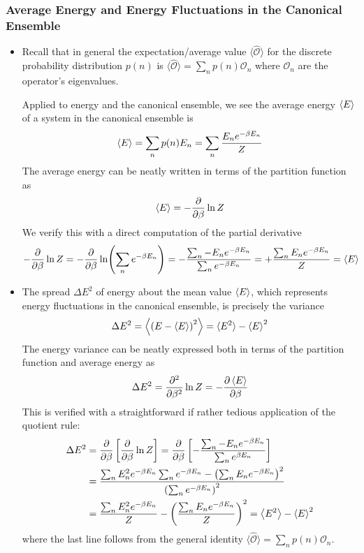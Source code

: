 \documentclass[11pt, a4paper]{article}
\begin{document}
\subsubsection{Average Energy and Energy Fluctuations in the Canonical Ensemble}
\begin{itemize}
	\item Recall that in general the expectation/average value $ \langle \hat{\mathcal{O}}\rangle $ for the discrete probability distribution $ p(n) $ is $  \langle \hat{\mathcal{O}}\rangle = \sum_{n}p(n)\mathcal{O}_{n} $ where $ \mathcal{O}_{n} $ are the operator's eigenvalues. 
	
	Applied to energy and the canonical ensemble, we see the average energy $ \expval{E} $ of a system in the canonical ensemble is
	\begin{equation*}
		\expval{E} = \sum_{n}p(n)E_{n} = \sum_{n} \frac{E_{n}e^{-\beta E_{n}}}{Z}
	\end{equation*}
	The average energy can be neatly written in terms of the partition function as
	\begin{equation*}
		\expval{E} = - \pdv{}{\beta} \ln Z
	\end{equation*}
	We verify this with a direct computation of the partial derivative
	\begin{equation*}
		- \pdv{}{\beta} \ln Z = - \pdv{}{\beta} \ln(\sum_{n}e^{-\beta E_{n}}) = - \frac{\sum_{n}-E_{n}e^{-\beta E_{n}}}{\sum_{n}e^{-\beta E_{n}}} = + \frac{\sum_{n}E_{n}e^{-\beta E_{n}}}{Z} = \expval{E}
	\end{equation*}
	
	\item The spread $ \Delta E^{2} $ of energy about the mean value $ \expval{E} $, which represents energy fluctuations in the canonical ensemble, is precisely the variance
	\begin{equation*}
		\Delta E^{2} = \expval{\left(E - \expval{E}\right)^{2}} = \langle E^{2}\rangle - \expval{E}^{2}
	\end{equation*}
	The energy variance can be neatly expressed both in terms of the partition function and average energy as
	\begin{equation*}
		\Delta E^{2} = \pdv[2]{}{\beta}\ln Z = -\pdv{\expval{E}}{\beta}
	\end{equation*}
	This is verified with a straightforward if rather tedious application of the quotient rule:
	\begin{align*}
		\Delta E^{2} &= \pdv{}{\beta}\left[\pdv{}{\beta} \ln Z\right] = \pdv{}{\beta}\left[- \frac{\sum_{n}-E_{n}e^{-\beta E_{n}}}{\sum_{n}e^{\beta E_{n}}}\right]\\
		&= \frac{\sum_{n}E_{n}^{2}e^{-\beta E_{n}}\sum_{n}e^{-\beta E_{n}} - \left(\sum_{n}E_{n}e^{-\beta E_{n}}\right)^{2}}{\left(\sum_{n}e^{-\beta E_{n}}\right)^{2}}\\
		&=\frac{\sum_{n}E_{n}^{2}e^{-\beta E_{n}}}{Z} - \left(\frac{\sum_{n}E_{n}e^{-\beta E_{n}}}{Z}\right)^{2} =  \expval{E^{2}} - \expval{E}^{2}
	\end{align*}
	where the last line follows from the general identity $  \langle \hat{\mathcal{O}}\rangle = \sum_{n}p(n)\mathcal{O}_{n} $.
	

\end{itemize}
\end{document}
